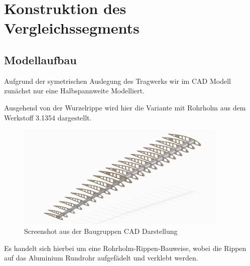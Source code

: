 \chapter{Konstruktion des Vergleichssegments}\label{cha:Konstruktion des Vergleichssegments}

\section{Modellaufbau}

Aufgrund der symetrischen Auslegung des Tragwerks wir im CAD Modell zunächst nur eine Halbspannweite Modelliert.

Ausgehend von der Wurzelrippe wird hier die Variante mit Rohrholm aus dem Werkstoff 3.1354 dargestellt.

\begin{figure}[H]
\centering
\includegraphics[width=0.9\textwidth]{bilder/Fotos/Halbspannweite.png}
\caption{Screenshot aus der Baugruppen CAD Darstellung} 
\label{fig:Screenshot aus der Baugruppen CAD Darstellung}
\end{figure}

Es handelt sich hierbei um eine Rohrholm-Rippen-Bauweise, wobei die Rippen auf das Aluminium Rundrohr aufgefädelt und verklebt werden.